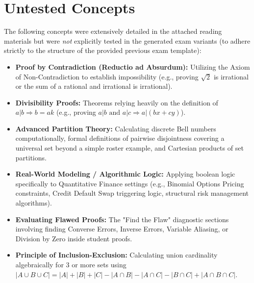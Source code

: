 \documentclass[11pt]{article}
\begin{document}
\newpage
\section*{Untested Concepts}
The following concepts were extensively detailed in the attached reading materials but were \textit{not} explicitly tested in the generated exam variants (to adhere strictly to the structure of the provided previous exam template):
\begin{itemize}
    \item \textbf{Proof by Contradiction (Reductio ad Absurdum):} Utilizing the Axiom of Non-Contradiction to establish impossibility (e.g., proving $\sqrt{2}$ is irrational or the sum of a rational and irrational is irrational).
    \item \textbf{Divisibility Proofs:} Theorems relying heavily on the definition of $a|b \Rightarrow b = ak$ (e.g., proving $a|b \text{ and } a|c \Rightarrow a|(bx+cy)$).
    \item \textbf{Advanced Partition Theory:} Calculating discrete Bell numbers computationally, formal definitions of pairwise disjointness covering a universal set beyond a simple roster example, and Cartesian products of set partitions.
    \item \textbf{Real-World Modeling / Algorithmic Logic:} Applying boolean logic specifically to Quantitative Finance settings (e.g., Binomial Options Pricing constraints, Credit Default Swap triggering logic, structural risk management algorithms).
    \item \textbf{Evaluating Flawed Proofs:} The "Find the Flaw" diagnostic sections involving finding Converse Errors, Inverse Errors, Variable Aliasing, or Division by Zero inside student proofs. 
    \item \textbf{Principle of Inclusion-Exclusion:} Calculating union cardinality algebraically for 3 or more sets using $|A \cup B \cup C| = |A| + |B| + |C| - |A \cap B| - |A \cap C| - |B \cap C| + |A \cap B \cap C|$.
\end{itemize}
\end{document}
